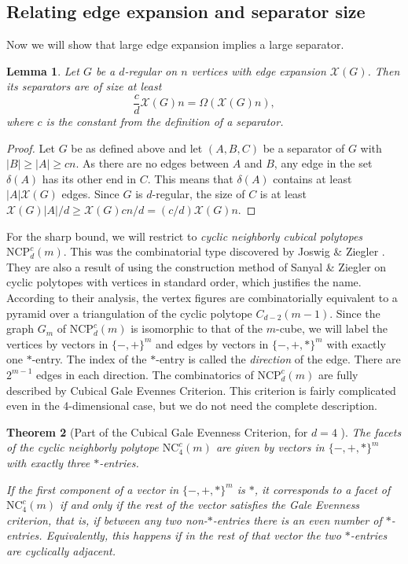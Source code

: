 \documentclass[a4paper,12pt]{book}
\theoremstyle{plain}
\newtheorem{theorem}{Theorem}[section]
\newtheorem{lemma}[theorem]{Lemma}
\theoremstyle{definition}
\newcommand\NC{\textrm{NCP}}
\newcommand\NCC{\mathrm{NC}^c}
\begin{document}
\subsection{Relating edge expansion and separator size}
Now we will show that large edge expansion implies a large separator.
\begin{lemma}
\label{separatorsize}
Let $G$ be a $d$-regular on $n$ vertices with edge expansion $\mathcal{X}(G)$.
Then its separators are of size at least
\begin{equation}
	\frac{c}{d}\mathcal{X}(G)n = \Omega(\mathcal{X}(G)n),
\end{equation}
where $c$ is the constant from the definition of a separator.
\end{lemma}
\begin{proof}
Let $G$ be as defined above and let $(A,B,C)$ be a separator of $G$ with $|B| \ge |A| \ge cn$.
As there are no edges between $A$ and $B$, any edge in the set $\delta(A)$ has its other end in
$C$. This means that $\delta(A)$ contains at least $|A|\mathcal{X}(G)$ edges. Since $G$ is $d$-regular,
the size of $C$ is at least $\mathcal{X}(G)|A|/d \ge \mathcal{X}(G)cn/d = (c/d)\mathcal{X}(G)n$.  
\end{proof}

For the sharp bound, we will restrict to \textit{cyclic neighborly cubical polytopes} 
 $\NC^c_d(m)$.
This was the combinatorial type discovered by Joswig \& Ziegler \cite{Z62}. They
are also a result of using the construction method of Sanyal \& Ziegler \cite{Z102}
on cyclic polytopes with vertices in standard order, which justifies the name.  According
to their analysis, the vertex figures are combinatorially equivalent to a pyramid over
a triangulation of the cyclic polytope $C_{d-2}(m-1)$. Since the graph $G_m$ of $\NC^c_d(m)$
is isomorphic to that of the $m$-cube, we will label the vertices by vectors in $\{-,+\}^m$ and
edges by vectors in $\{-,+,*\}^m$ with exactly one $*$-entry. The index of the $*$-entry is
called the \textit{direction} of the edge. There are $2^{m-1}$ edges in each direction.
The combinatorics of $\NC^c_d(m)$ are fully described by Cubical Gale Evennes Criterion.
This criterion is fairly complicated even in the 4-dimensional case, but we do not need the 
complete description.

\begin{theorem}
[Part of the Cubical Gale Evenness Criterion, for $d=4$ {\cite[Thm.~18]{Z62}}] 
The facets of the cyclic neighborly polytope $\NCC_4(m)$ are given by vectors in
$\{-,+,*\}^m$ with exactly three $*$-entries. 

If the first component of a vector in $\{-,+,*\}^m$ is $*$, it corresponds to a facet 
of $\NCC_4(m)$ if and only if the rest of the vector satisfies the Gale Evenness criterion, 
that is, if between any two non-$*$-entries there is an even number of $*$-entries.
Equivalently, this happens if in the rest of that vector the two $*$-entries are
cyclically adjacent.
\end{theorem}
\end{document}
